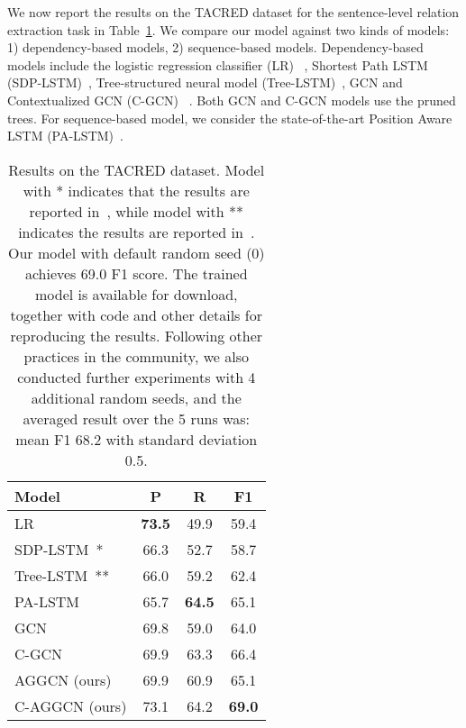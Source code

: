 \documentclass[11pt,a4paper]{article}
\begin{document}
We now report the results on the TACRED dataset for the sentence-level relation extraction task  in Table~\ref{tab:tacred}.  We compare our model against two kinds of  models: 1) dependency-based models, 2) sequence-based models. Dependency-based models include the logistic regression classifier (LR) ~\citep{Zhang2017PositionawareAA}, Shortest Path LSTM (SDP-LSTM)~\citep{Xu2015ClassifyingRV}, Tree-structured neural model (Tree-LSTM)~\citep{Tai2015ImprovedSR}, GCN and Contextualized GCN (C-GCN) ~\citep{Zhang2018GraphCO}.   Both GCN and C-GCN models use the pruned trees. For sequence-based model, we consider the state-of-the-art  Position Aware LSTM (PA-LSTM)~\citep{Zhang2017PositionawareAA}. 








\begin{table}[!t]
\centering
\setlength{\tabcolsep}{3pt}
\begin{tabular}{lccc}
\toprule
\bf Model & P & R & F1 \\
\midrule
LR~\citep{Zhang2017PositionawareAA}          & \textbf{73.5} &49.9 &	59.4 \\
SDP-LSTM~\citep{Xu2015ClassifyingRV}{*}    & 66.3 &52.7 &	58.7 \\
Tree-LSTM~\citep{Tai2015ImprovedSR}{**}          & 66.0 &59.2 &	62.4\\
PA-LSTM~\citep{Zhang2017PositionawareAA}     & 65.7 & \textbf{64.5} &	65.1\\
\midrule
GCN~\citep{Zhang2018GraphCO}                 & 69.8 &59.0 &	64.0\\
C-GCN~\citep{Zhang2018GraphCO}               & 69.9 &63.3 &	66.4\\
\midrule
AGGCN (ours)                                 & 69.9 & 60.9 &	65.1 \\
C-AGGCN (ours)                            & 73.1 & 64.2  & \textbf{69.0} \\
\bottomrule
\end{tabular}
\caption{Results on the TACRED dataset. Model with * indicates that the results are reported in~\citet{Zhang2017PositionawareAA}, while model with ** indicates the results are reported in~\citet{Zhang2018GraphCO}.  Our model with default random seed (0) achieves 69.0 F1 score. {The trained model is available for download, together with code and other details for reproducing the results. Following other practices in the community, we also conducted further experiments with 4 additional random seeds, and the averaged result over the 5 runs was: mean F1 68.2 with standard deviation 0.5.}}
\label{tab:tacred}
\end{table}
 
\end{document}
